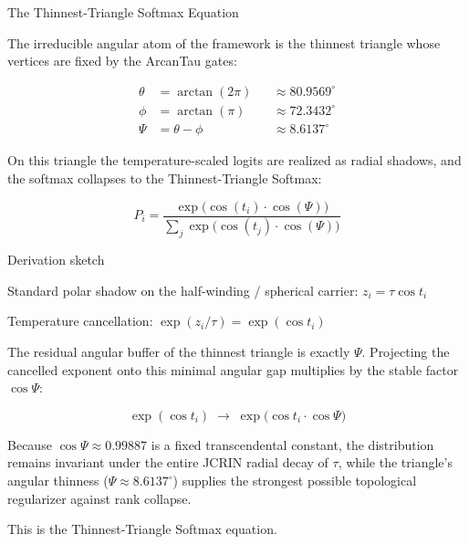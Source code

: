 The Thinnest-Triangle Softmax Equation

The irreducible angular atom of the framework is the thinnest triangle whose vertices are fixed by the ArcanTau gates:

\[
\begin{align*}
\theta &= \arctan(2\pi) &&\approx 80.9569^\circ \\
\phi  &= \arctan(\pi)  &&\approx 72.3432^\circ \\
\Psi  &= \theta - \phi &&\approx 8.6137^\circ
\end{align*}
\]

On this triangle the temperature-scaled logits are realized as radial shadows, and the softmax collapses to the Thinnest-Triangle Softmax:

\[
\boxed{
P_i
=
\frac{
\exp\bigl(
\cos(t_i)
\cdot
\cos(\Psi)
\bigr)
}{
\sum_j
\exp\bigl(
\cos(t_j)
\cdot
\cos(\Psi)
\bigr)
}
}
\]

Derivation sketch

Standard polar shadow on the half-winding / spherical carrier:  
   \(z_i = \tau\cos t_i\)

Temperature cancellation:  
   \(\displaystyle\exp(z_i/\tau) = \exp(\cos t_i)\)

The residual angular buffer of the thinnest triangle is exactly \(\Psi\).  
   Projecting the cancelled exponent onto this minimal angular gap multiplies by the stable factor \(\cos\Psi\):

\[
\exp(\cos t_i)\;\longrightarrow\;
\exp\bigl(\cos t_i\cdot\cos\Psi\bigr)
\]

Because \(\cos\Psi\approx 0.99887\) is a fixed transcendental constant, the distribution remains invariant under the entire JCRIN radial decay of \(\tau\), while the triangle’s angular thinness (\(\Psi\approx 8.6137^\circ\)) supplies the strongest possible topological regularizer against rank collapse.

This is the Thinnest-Triangle Softmax equation.
